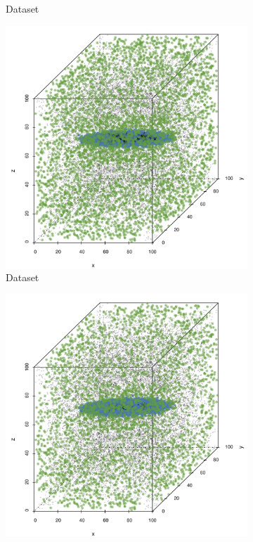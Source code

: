 \begin{figure}
\begin{subfigure}{0.23\textwidth}
			\caption{Dataset \baakmanOne}
			\label{fig:discussion:anisotropy:baakman1}
		\end{subfigure}	
		\begin{subfigure}{0.23\textwidth}
			\centering
			\includegraphics[keepaspectratio=true, width=\textwidth, height=0.23\textheight]{discussion/img/baakman_4_60000_anisotropy.png}
			\caption{Dataset \baakmanFour}
			\label{fig:discussion:anisotropy:baakman4}
		\end{subfigure}		
		\begin{subfigure}{0.23\textwidth}
			\centering
			\includegraphics[keepaspectratio=true, width=\textwidth, height=0.23\textheight]{discussion/img/baakman_5_60000_anisotropy.png}

\end{subfigure}
\end{figure}

